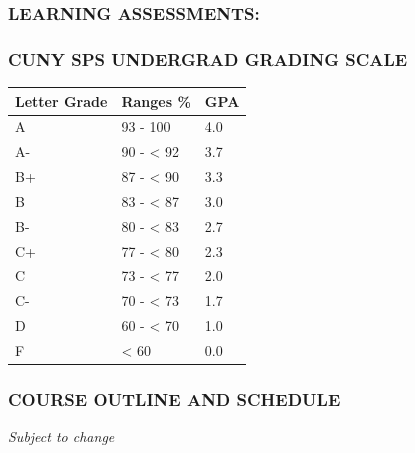 \documentclass[
  letterpaper,
  DIV=11,
  numbers=noendperiod]{scrartcl}
\begin{document}
\subsubsection{LEARNING ASSESSMENTS:}\label{learning-assessments}

\subsubsection{CUNY SPS UNDERGRAD GRADING
SCALE}\label{cuny-sps-undergrad-grading-scale}

\begin{longtable}[]{@{}lll@{}}
\toprule\noalign{}
Letter Grade & Ranges \% & GPA \\
\midrule\noalign{}
\endhead
\bottomrule\noalign{}
\endlastfoot
A & 93 - 100 & 4.0 \\
A- & 90 - \textless{} 92 & 3.7 \\
B+ & 87 - \textless{} 90 & 3.3 \\
B & 83 - \textless{} 87 & 3.0 \\
B- & 80 - \textless{} 83 & 2.7 \\
C+ & 77 - \textless{} 80 & 2.3 \\
C & 73 - \textless{} 77 & 2.0 \\
C- & 70 - \textless{} 73 & 1.7 \\
D & 60 - \textless{} 70 & 1.0 \\
F & \textless{} 60 & 0.0 \\
\end{longtable}

\subsubsection{COURSE OUTLINE AND
SCHEDULE}\label{course-outline-and-schedule}

\emph{Subject to change}
\end{document}
